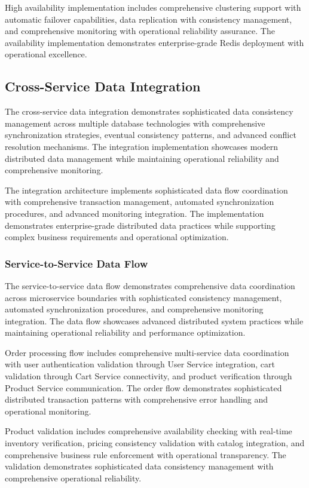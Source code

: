 High availability implementation includes comprehensive clustering support with automatic failover capabilities, data replication with consistency management, and comprehensive monitoring with operational reliability assurance. The availability implementation demonstrates enterprise-grade Redis deployment with operational excellence.

\subsection{Cross-Service Data Integration}

The cross-service data integration demonstrates sophisticated data consistency management across multiple database technologies with comprehensive synchronization strategies, eventual consistency patterns, and advanced conflict resolution mechanisms. The integration implementation showcases modern distributed data management while maintaining operational reliability and comprehensive monitoring.

The integration architecture implements sophisticated data flow coordination with comprehensive transaction management, automated synchronization procedures, and advanced monitoring integration. The implementation demonstrates enterprise-grade distributed data practices while supporting complex business requirements and operational optimization.

\subsubsection{Service-to-Service Data Flow}

The service-to-service data flow demonstrates comprehensive data coordination across microservice boundaries with sophisticated consistency management, automated synchronization procedures, and comprehensive monitoring integration. The data flow showcases advanced distributed system practices while maintaining operational reliability and performance optimization.

Order processing flow includes comprehensive multi-service data coordination with user authentication validation through User Service integration, cart validation through Cart Service connectivity, and product verification through Product Service communication. The order flow demonstrates sophisticated distributed transaction patterns with comprehensive error handling and operational monitoring.

Product validation includes comprehensive availability checking with real-time inventory verification, pricing consistency validation with catalog integration, and comprehensive business rule enforcement with operational transparency. The validation demonstrates sophisticated data consistency management with comprehensive operational reliability.


